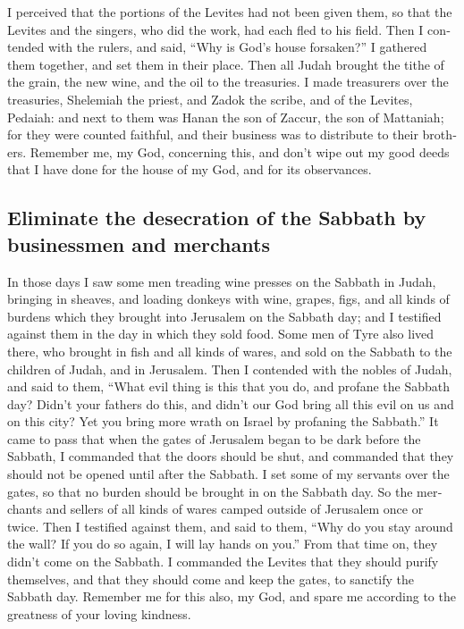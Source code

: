 \begin{paracol}{2}
\begin{otherlanguage}{english}
 I perceived that the portions of the Levites had not
been given them, so that the Levites and the singers, who did the work,
had each fled to his field.  Then I contended with the
rulers, and said, ``Why is God's house forsaken?'' I gathered them
together, and set them in their place.  Then all Judah
brought the tithe of the grain, the new wine, and the oil to the
treasuries.  I made treasurers over the treasuries,
Shelemiah the priest, and Zadok the scribe, and of the Levites, Pedaiah:
and next to them was Hanan the son of Zaccur, the son of Mattaniah; for
they were counted faithful, and their business was to distribute to
their brothers.  Remember me, my God, concerning this,
and don't wipe out my good deeds that I have done for the house of my
God, and for its observances.

\hypertarget{eliminate-the-desecration-of-the-sabbath-by-businessmen-and-merchants}{%
\subsection{Eliminate the desecration of the Sabbath by businessmen and
merchants}\label{eliminate-the-desecration-of-the-sabbath-by-businessmen-and-merchants}}

 In those days I saw some men treading wine presses on
the Sabbath in Judah, bringing in sheaves, and loading donkeys with
wine, grapes, figs, and all kinds of burdens which they brought into
Jerusalem on the Sabbath day; and I testified against them in the day in
which they sold food.  Some men of Tyre also lived there,
who brought in fish and all kinds of wares, and sold on the Sabbath to
the children of Judah, and in Jerusalem.  Then I
contended with the nobles of Judah, and said to them, ``What evil thing
is this that you do, and profane the Sabbath day?  Didn't
your fathers do this, and didn't our God bring all this evil on us and
on this city? Yet you bring more wrath on Israel by profaning the
Sabbath.''  It came to pass that when the gates of
Jerusalem began to be dark before the Sabbath, I commanded that the
doors should be shut, and commanded that they should not be opened until
after the Sabbath. I set some of my servants over the gates, so that no
burden should be brought in on the Sabbath day.  So the
merchants and sellers of all kinds of wares camped outside of Jerusalem
once or twice.  Then I testified against them, and said
to them, ``Why do you stay around the wall? If you do so again, I will
lay hands on you.'' From that time on, they didn't come on the Sabbath.
 I commanded the Levites that they should purify
themselves, and that they should come and keep the gates, to sanctify
the Sabbath day. Remember me for this also, my God, and spare me
according to the greatness of your loving kindness.


\end{otherlanguage}
\end{paracol}
